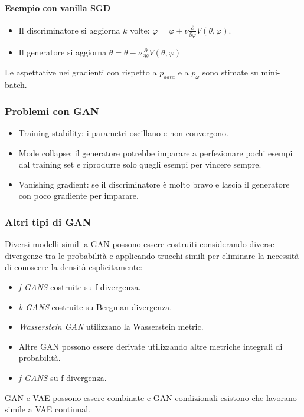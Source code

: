 \paragraph{Esempio con vanilla SGD}
\begin{multicols}{2}
	\begin{itemize}
		\item Il discriminatore si aggiorna $k$ volte: $\varphi = \varphi + \nu\frac{\partial}{\partial\varphi}V(\theta,\varphi)$.
		\item Il generatore si aggiorna $\theta = \theta-\nu\frac{\partial}{\partial\theta}V(\theta,\varphi)$
	\end{itemize}
\end{multicols}
Le aspettative nei gradienti con rispetto a $p_{data}$ e a $p_\omega$ sono stimate su mini-batch.

\subsubsection{Problemi con GAN}
\begin{itemize}
	\item Training stability: i parametri oscillano e non convergono.
	\item Mode collapse: il generatore potrebbe imparare a perfezionare pochi esempi dal training set e riprodurre solo quegli esempi per vincere sempre.
	\item Vanishing gradient: se il discriminatore \`e molto bravo e lascia il generatore con poco gradiente per imparare.
\end{itemize}

\subsubsection{Altri tipi di GAN}
Diversi modelli simili a GAN possono essere costruiti considerando diverse divergenze tra le probabilit\`a e applicando trucchi simili per eliminare la necessit\`a di conoscere la densit\`a esplicitamente:
\begin{multicols}{2}
	\begin{itemize}
		\item \emph{f-GANS} costruite su f-divergenza.
		\item \emph{b-GANS} costruite su Bergman divergenza.
		\item \emph{Wasserstein GAN} utilizzano la Wasserstein metric.
		\item Altre GAN possono essere derivate utilizzando altre metriche integrali di probabilit\`a.
		\item \emph{f-GANS} su f-divergenza.
	\end{itemize}
\end{multicols}
GAN e VAE possono essere combinate e GAN condizionali esistono che lavorano simile a VAE continual.
